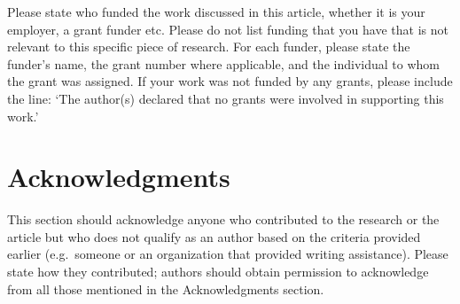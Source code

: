 \documentclass[9pt,a4paper,]{extarticle}
\begin{document}
Please state who funded the work discussed in this article, whether it is your employer, a grant funder etc. Please do not list funding that you have that is not relevant to this specific piece of research. For each funder, please state the funder's name, the grant number where applicable, and the individual to whom the grant was assigned. If your work was not funded by any grants, please include the line: `The author(s) declared that no grants were involved in supporting this work.'

\hypertarget{acknowledgments}{%
\section{Acknowledgments}\label{acknowledgments}}

This section should acknowledge anyone who contributed to the research or the article but who does not qualify as an author based on the criteria provided earlier (e.g.~someone or an organization that provided writing assistance). Please state how they contributed; authors should obtain permission to acknowledge from all those mentioned in the Acknowledgments section.

{\small}
\end{document}
